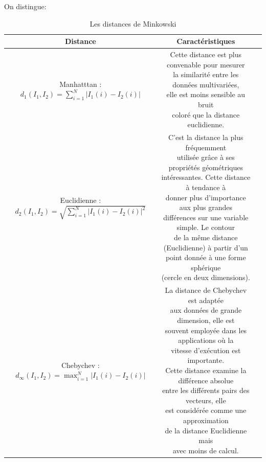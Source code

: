 On distingue:
\begin{table}[H]
	\begin{tabular}{|c|c|c|}
		\hline
		\textbf{Distance} & \textbf{Caractéristiques}\\
		\hline
		\makecell{Manhatttan : \\ $  d_1(I_1, I_2) = \sum_{i=1}^{N} \left|{I}_{1}(i)-{I}_{2}(i)\right|  $ } 
		& \makecell{Cette distance est plus convenable pour mesurer\\
			  la similarité entre les données  multivariées,\\ 
			 elle est moins sensible au  bruit\\
			 coloré que la distance euclidienne. }   \\
		\hline
		
		
		\makecell{Euclidienne :\\ $ d_2(I_1, I_2) =  \sqrt{\sum_{i=1}^{N} \left|{I}_{1}(i)-{I}_{2}(i)\right|^2} $}  
		& \makecell{C’est la distance la plus fréquemment \\
			utilisée grâce à ses propriétés géométriques \\
			intéressantes. Cette distance à tendance à \\
			donner plus d’importance aux plus grandes \\
			différences sur une variable simple. Le contour\\
			 de la même distance (Euclidienne) à partir d’un \\
			 point donnée à  une forme sphérique \\(cercle en deux dimensions).}   \\
		\hline
		
		\makecell{Chebychev :\\ 
			$d_{\infty}(I_1, I_2)=\max_{i=1}^N \left|{I}_{1}(i)-{I}_{2}(i)\right|$  
		} 
		 & \makecell{La distance de Chebychev est adaptée \\
		 	aux données de grande dimension, elle est \\
		 	souvent employée dans les applications où la\\
		 	 vitesse d’exécution est importante.\\ 
		 	 Cette distance examine la différence absolue\\
		 	  entre les différents pairs des vecteurs, elle\\
		 	   est considérée comme une approximation\\ 
		 	   de la distance Euclidienne mais\\
		 	    avec moins de calcul.} \\   
		\hline
		
	
	\end{tabular}
	\caption{Les distances de Minkowski}
\end{table}

